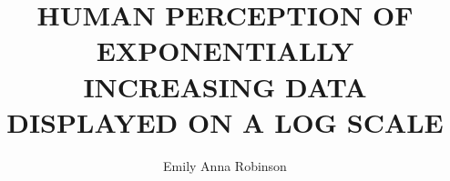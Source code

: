 \documentclass[print]{nuthesis}
\begin{document}
\frontmatter
\title{HUMAN PERCEPTION OF EXPONENTIALLY INCREASING DATA DISPLAYED ON A LOG SCALE}
\author{Emily Anna Robinson}
\adviserAbstract{}
\maketitle
\end{document}

